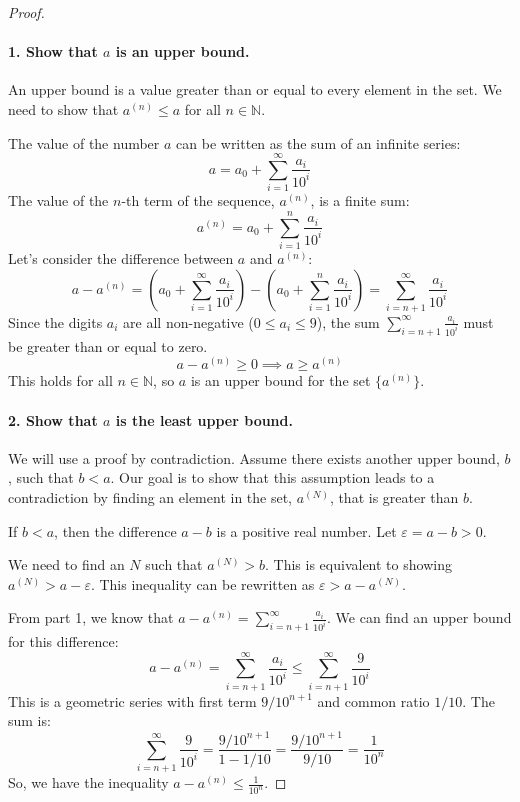\documentclass[12pt,a4paper]{article}
\theoremstyle{definition}
\theoremstyle{remark}
\begin{document}
\begin{proof}
\
\paragraph{1. Show that $a$ is an upper bound.}
An upper bound is a value greater than or equal to every element in the set. We need to show that $a^{(n)} \le a$ for all $n \in \mathbb{N}$.

The value of the number $a$ can be written as the sum of an infinite series:
\[ a = a_0 + \sum_{i=1}^{\infty} \frac{a_i}{10^i} \]
The value of the $n$-th term of the sequence, $a^{(n)}$, is a finite sum:
\[ a^{(n)} = a_0 + \sum_{i=1}^{n} \frac{a_i}{10^i} \]
Let's consider the difference between $a$ and $a^{(n)}$:
\[ a - a^{(n)} = \left(a_0 + \sum_{i=1}^{\infty} \frac{a_i}{10^i}\right) - \left(a_0 + \sum_{i=1}^{n} \frac{a_i}{10^i}\right) = \sum_{i=n+1}^{\infty} \frac{a_i}{10^i} \]
Since the digits $a_i$ are all non-negative ($0 \le a_i \le 9$), the sum $\sum_{i=n+1}^{\infty} \frac{a_i}{10^i}$ must be greater than or equal to zero.
\[ a - a^{(n)} \ge 0 \implies a \ge a^{(n)} \]
This holds for all $n \in \mathbb{N}$, so $a$ is an upper bound for the set $\{a^{(n)}\}$.

\paragraph{2. Show that $a$ is the least upper bound.}
We will use a proof by contradiction. Assume there exists another upper bound, $b$, such that $b < a$. Our goal is to show that this assumption leads to a contradiction by finding an element in the set, $a^{(N)}$, that is greater than $b$.

If $b < a$, then the difference $a - b$ is a positive real number. Let $\varepsilon = a - b > 0$.

We need to find an $N$ such that $a^{(N)} > b$. This is equivalent to showing $a^{(N)} > a - \varepsilon$.
This inequality can be rewritten as $\varepsilon > a - a^{(N)}$.

From part 1, we know that $a - a^{(n)} = \sum_{i=n+1}^{\infty} \frac{a_i}{10^i}$. We can find an upper bound for this difference:
\[ a - a^{(n)} = \sum_{i=n+1}^{\infty} \frac{a_i}{10^i} \le \sum_{i=n+1}^{\infty} \frac{9}{10^i} \]
This is a geometric series with first term $9/10^{n+1}$ and common ratio $1/10$. The sum is:
\[ \sum_{i=n+1}^{\infty} \frac{9}{10^i} = \frac{9/10^{n+1}}{1 - 1/10} = \frac{9/10^{n+1}}{9/10} = \frac{1}{10^n} \]
So, we have the inequality $a - a^{(n)} \le \frac{1}{10^n}$.


\end{proof}
\end{document}
